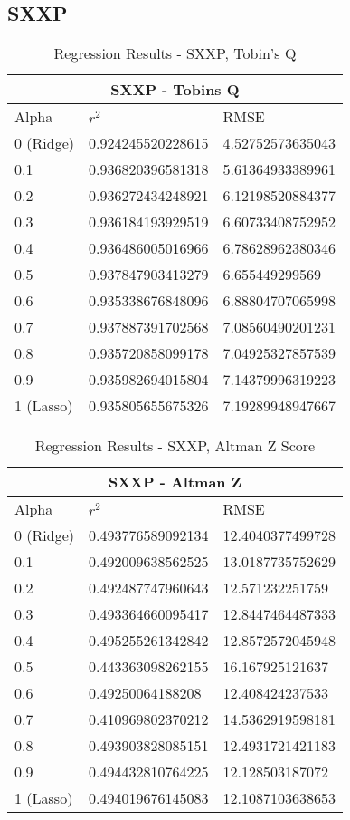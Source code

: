 \subsection{SXXP}
\begin{table}[h!]
\centering
\begin{tabular}{ |p{2.5cm}||p{4cm}|p{4cm}| }
 \hline
 \multicolumn{3}{|c|}{SXXP - Tobins Q} \\
 \hline
 Alpha & $r^2$ & RMSE \\
 \hline
0 (Ridge) & 0.924245520228615 & 4.52752573635043\\
0.1 & 0.936820396581318 & 5.61364933389961\\
0.2 & 0.936272434248921 & 6.12198520884377\\
0.3 & 0.936184193929519 & 6.60733408752952\\
0.4 & 0.936486005016966 & 6.78628962380346\\
0.5 & 0.937847903413279 & 6.655449299569\\
0.6 & 0.935338676848096 & 6.88804707065998\\
0.7 & 0.937887391702568 & 7.08560490201231\\
0.8 & 0.935720858099178 & 7.04925327857539\\
0.9 & 0.935982694015804 & 7.14379996319223\\
1 (Lasso) & 0.935805655675326 & 7.19289948947667\\
 \hline
\end{tabular}
\caption{Regression Results  - SXXP, Tobin's Q}
\end{table}

\begin{table}[h!]
\centering
\begin{tabular}{ |p{2.5cm}||p{4cm}|p{4cm}| }
 \hline
 \multicolumn{3}{|c|}{SXXP - Altman Z} \\
 \hline
 Alpha & $r^2$ & RMSE \\
 \hline
0 (Ridge) & 0.493776589092134 & 12.4040377499728\\
0.1 & 0.492009638562525 & 13.0187735752629\\
0.2 & 0.492487747960643 & 12.571232251759\\
0.3 & 0.493364660095417 & 12.8447464487333\\
0.4 & 0.495255261342842 & 12.8572572045948\\
0.5 & 0.443363098262155 & 16.167925121637\\
0.6 & 0.49250064188208 & 12.408424237533\\
0.7 & 0.410969802370212 & 14.5362919598181\\
0.8 & 0.493903828085151 & 12.4931721421183\\
0.9 & 0.494432810764225 & 12.128503187072\\
1 (Lasso) & 0.494019676145083 & 12.1087103638653\\
 \hline
\end{tabular}
\caption{Regression Results  - SXXP, Altman Z Score}
\end{table}
\clearpage


